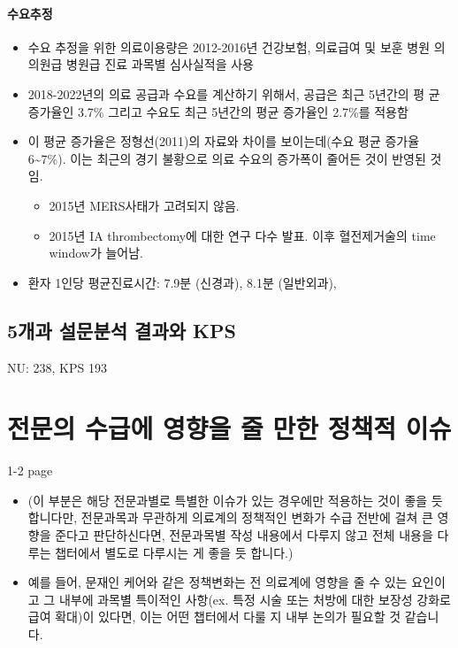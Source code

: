 \documentclass[]{book}
\providecommand{\tightlist}{%
  \setlength{\itemsep}{0pt}\setlength{\parskip}{0pt}}
\begin{document}
\hypertarget{section-8}{%
\subsubsection{수요추정}\label{section-8}}

\begin{itemize}
\item
  수요 추정을 위한 의료이용량은 2012-2016년 건강보험, 의료급여 및 보훈 병원 의 의원급 병원급 진료 과목별 심사실적을 사용
\item
  2018-2022년의 의료 공급과 수요를 계산하기 위해서, 공급은 최근 5년간의 평 균 증가율인 3.7\% 그리고 수요도 최근 5년간의 평균 증가율인 2.7\%를 적용함
\item
  이 평균 증가율은 정형선(2011)의 자료와 차이를 보이는데(수요 평균 증가율 6\textasciitilde7\%). 이는 최근의 경기 불황으로 의료 수요의 증가폭이 줄어든 것이 반영된 것임.

  \begin{itemize}
  \tightlist
  \item
    2015년 MERS사태가 고려되지 않음.
  \item
    2015년 IA thrombectomy에 대한 연구 다수 발표. 이후 혈전제거술의 time window가 늘어남.
  \end{itemize}
\item
  환자 1인당 평균진료시간: 7.9분 (신경과), 8.1분 (일반외과),
\end{itemize}

\hypertarget{kps}{%
\section{5개과 설문분석 결과와 KPS}\label{kps}}

NU: 238, KPS 193

\hypertarget{section-9}{%
\chapter{전문의 수급에 영향을 줄 만한 정책적 이슈}\label{section-9}}

1-2 page

\begin{itemize}
\item
  (이 부분은 해당 전문과별로 특별한 이슈가 있는 경우에만 적용하는 것이 좋을 듯 합니다만, 전문과목과 무관하게 의료계의 정책적인 변화가 수급 전반에 걸쳐 큰 영향을 준다고 판단하신다면, 전문과목별 작성 내용에서 다루지 않고 전체 내용을 다루는 챕터에서 별도로 다루시는 게 좋을 듯 합니다.)
\item
  예를 들어, 문재인 케어와 같은 정책변화는 전 의료계에 영향을 줄 수 있는 요인이고 그 내부에 과목별 특이적인 사항(ex. 특정 시술 또는 처방에 대한 보장성 강화로 급여 확대)이 있다면, 이는 어떤 챕터에서 다룰 지 내부 논의가 필요할 것 같습니다.
\end{itemize}
\end{document}
